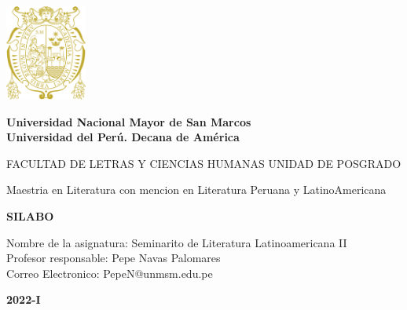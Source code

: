 \documentclass[a4paper]{article}
\begin{document}
\begin{titlepage}
\begin{center}
\includegraphics[width=0.2\textwidth]{logo UNMSM.png}
\end{center}
\begin{center}
{\huge \bf Universidad Nacional Mayor de San Marcos}\\[0.3cm]
{\large \bf Universidad del Perú. Decana de América}\\[0.5cm]
\end{center}
\vspace{0.5cm}
\begin{center}
\large{FACULTAD DE LETRAS Y CIENCIAS HUMANAS}
\large{UNIDAD DE POSGRADO}
\end{center}
\vspace{0.5cm}
\begin{center}
{\large Maestria en Literatura con mencion en Literatura Peruana y LatinoAmericana}\\[0.3cm]
\end{center}
\vspace{0.10cm}
\begin{center}
{\huge \bf SILABO}\\[0.3cm]
\end{center}
\vspace{2cm}
\begin{flushleft}
Nombre de la asignatura: Seminarito de Literatura Latinoamericana II \\ 
Profesor responsable: Pepe Navas Palomares \\ 
Correo Electronico: PepeN@unmsm.edu.pe \\ 
\end{flushleft}
\vspace{2cm}
\begin{center}
{\huge \bf 2022-I}\\[0.3cm]
\end{center}
\end{titlepage}
\newpage
\end{document}
